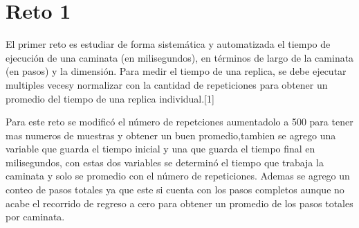 \documentclass{article}
\begin{document}
 
\section{Reto 1}
El primer reto es estudiar de forma sistemática y automatizada el tiempo de ejecución de una caminata (en milisegundos), en términos de largo de la caminata (en pasos) y la dimensión. Para medir el tiempo de una replica, se debe ejecutar multiples vecesy normalizar con la cantidad de repeticiones para obtener un promedio del tiempo de una replica individual.[1]

Para este reto se modificó el número de repetciones aumentadolo a 500 para tener mas numeros de muestras y obtener un buen promedio,tambien se agrego una variable que guarda el tiempo inicial y una que guarda el tiempo final en milisegundos, con estas dos variables se determinó el tiempo que trabaja la caminata y solo se promedio con el número de repeticiones.
Ademas se agrego un conteo de pasos totales ya que este si cuenta con los pasos completos aunque no acabe el recorrido de regreso a cero para obtener un promedio de los pasos totales por caminata.
\end{document}
